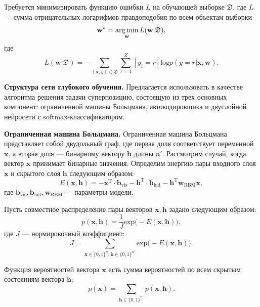 Требуется минимизировать функцию ошибки $L$ на обучающей выборке $\mathfrak{D}$,
где $L$ --- сумма отрицательных логарифмов правдоподобия по всем объектам выборки
\[
\mathbf{w}^{*} = \operatorname*{arg\,min}_\mathbf{w} L(\mathbf{w}|\mathfrak{D}),
\]
где
\[
 L(\mathbf{w}|\mathfrak{D}) = -\sum_{(\mathbf{x},y) \in \mathfrak{D} } \sum_{r=1}^Z [y_i = r] \text{log} p(y=r|\mathbf{x},\mathbf{w}).
\]

\textbf{Структура сети глубокого обучения. }
Предлагается использовать в качестве алгоритма решения задачи суперпозицию, состоящую из трех основных компонент:
ограниченной машины Больцмана, автокодировщика и двуслойной нейросети с softmax-классификатором.

\textbf{Ограниченная машина Больцмана.}
Ограниченная машина Больцмана представляет собой двудольный граф, где первая доля соответствует переменной $\mathbf{x}$, а вторая доля --- бинарному вектору $\mathbf{h}$ длины $n'$.
Рассмотрим случай, когда вектор $\mathbf{x}$ принимает бинарные значения. Определим энергию пары входного слоя $\mathbf{x}$ и скрытого слоя $\mathbf{h}$ следующим образом:
\[
 E(\mathbf{x},\mathbf{h}) = -\mathbf{x}^\text{T} \cdot \mathbf{b}_\text{vis} -\mathbf{h}^\text{T} \cdot \mathbf{b}_\text{hid} - \mathbf{h}^\text{T}\mathbf{w}_\text{RBM}\mathbf{x},
\]
где $\mathbf{b}_\text{vis}, \mathbf{b}_\text{hid}, \mathbf{w}_\text{RBM}$ --- параметры модели.

Пусть совместное распределение пары векторов $\mathbf{x}, \mathbf{h}$ задано следующим образом:
\[
	p(\mathbf{x}, \mathbf{h}) = \frac{1}{J} \text{exp}\bigl(-E(\mathbf{x},\mathbf{h})\bigr),
\]
где $J$ --- нормировочный коэффициент:
\[
 J = \sum_{\mathbf{x} \in \{0,1\}^n, \mathbf{h}\in \{0,1\}^{n'}} \text{exp}\bigl(-E(\mathbf{x},\mathbf{h})\bigr).
\]


Функция вероятностей вектора $\mathbf{x}$ есть сумма вероятностей по всем скрытым состояниям вектора $\mathbf{h}$:
\[
	p(\mathbf{x}) = \sum_{\mathbf{h}\in \{0,1\}^{n'}} p(\mathbf{x}, \mathbf{h}).
\]

